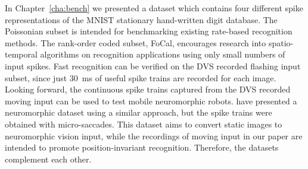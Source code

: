 %
In Chapter~\ref{cha:bench} we presented a dataset which contains four different spike representations of the MNIST stationary hand-written digit database. %
The Poissonian subset is intended for benchmarking existing rate-based recognition methods.
The rank-order coded subset, FoCal, encourages research into spatio-temporal algorithms on recognition applications using only small numbers of input spikes.
Fast recognition can be verified on the DVS recorded flashing input subset, since just 30~ms of useful spike trains are recorded for each image.
Looking forward, the continuous spike trains captured from the DVS recorded moving input can be used to test mobile neuromorphic robots.
\citep{orchard2015convert} have presented a neuromorphic dataset using a similar approach, but the spike trains were obtained with micro-saccades.
This dataset aims to convert static images to neuromorphic vision input, while the recordings of moving input in our paper are intended to promote position-invariant recognition.
Therefore, the datasets complement each other.


